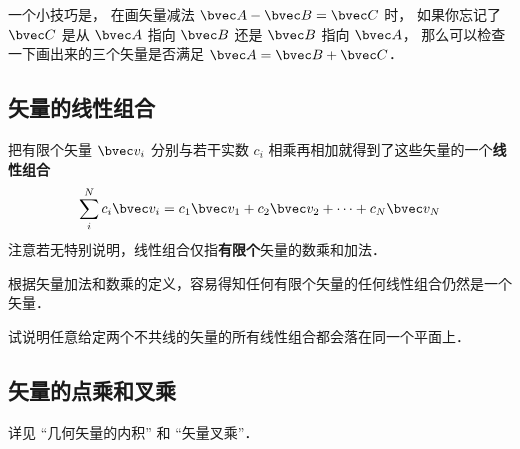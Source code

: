 一个小技巧是， 在画矢量减法 $\bvec A - \bvec B = \bvec C$ 时， 如果你忘记了 $\bvec C$ 是从 $\bvec A$ 指向 $\bvec B$ 还是 $\bvec B$ 指向 $\bvec A$， 那么可以检查一下画出来的三个矢量是否满足 $\bvec A = \bvec B + \bvec C$．


\subsection{矢量的线性组合}
把有限个矢量 $\bvec v_i$ 分别与若干实数 $c_i$ 相乘再相加就得到了这些矢量的一个\textbf{线性组合}
\begin{equation}\label{GVecOp_eq1}
\sum_i^N c_i \bvec v_i = c_1\bvec v_1 + c_2\bvec v_2 +\dots +c_N \bvec v_N
\end{equation}
注意若无特别说明，线性组合仅指\textbf{有限个}矢量的数乘和加法．

根据矢量加法和数乘的定义，容易得知任何有限个矢量的任何线性组合仍然是一个矢量．

\begin{exercise}{}
试说明任意给定两个不共线的矢量的所有线性组合都会落在同一个平面上．
\end{exercise}

\subsection{矢量的点乘和叉乘}
详见 “几何矢量的内积” 和 “矢量叉乘”．
